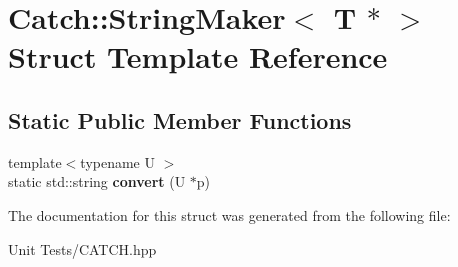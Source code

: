 \hypertarget{structCatch_1_1StringMaker_3_01T_01_5_01_4}{}\section{Catch\+:\+:String\+Maker$<$ T $\ast$ $>$ Struct Template Reference}
\label{structCatch_1_1StringMaker_3_01T_01_5_01_4}
\subsection*{Static Public Member Functions}
\begin{DoxyCompactItemize}
\item 
{\footnotesize template$<$typename U $>$ }\\static std\+::string {\bfseries convert} (U $\ast$p)\hypertarget{structCatch_1_1StringMaker_3_01T_01_5_01_4_a2adbc75c99d71b8323f4052bcb0815c9}{}\label{structCatch_1_1StringMaker_3_01T_01_5_01_4_a2adbc75c99d71b8323f4052bcb0815c9}

\end{DoxyCompactItemize}


The documentation for this struct was generated from the following file\+:\begin{DoxyCompactItemize}
\item 
Unit Tests/C\+A\+T\+C\+H.\+hpp\end{DoxyCompactItemize}
